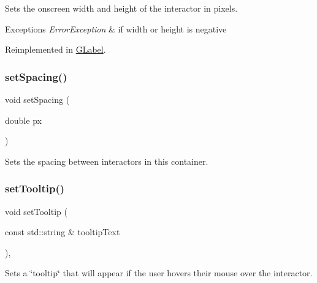 Sets the onscreen width and height of the interactor in pixels. 


\begin{DoxyExceptions}{Exceptions}
{\em Error\+Exception} & if width or height is negative \\
\hline
\end{DoxyExceptions}


Reimplemented in \mbox{\hyperlink{classsgl_1_1GLabel_a42d96e60c62d7770993327d7147d77b8}{G\+Label}}.

\mbox{\label{classsgl_1_1GContainer_a0f85f7b45435b302ae701cb00574bf52}} 
\subsubsection{\texorpdfstring{set\+Spacing()}{setSpacing()}}
{\footnotesize\ttfamily void set\+Spacing (\begin{DoxyParamCaption}\item[{double}]{px }\end{DoxyParamCaption})\hspace{0.3cm}{\ttfamily [virtual]}}



Sets the spacing between interactors in this container. 

\mbox{\label{classsgl_1_1GInteractor_a039e0e49beaecc275efce02d416acea8}} 
\subsubsection{\texorpdfstring{set\+Tooltip()}{setTooltip()}}
{\footnotesize\ttfamily void set\+Tooltip (\begin{DoxyParamCaption}\item[{const std\+::string \&}]{tooltip\+Text }\end{DoxyParamCaption})\hspace{0.3cm}{\ttfamily [virtual]}, {\ttfamily [inherited]}}



Sets a \char`\"{}tooltip\char`\"{} that will appear if the user hovers their mouse over the interactor. 

